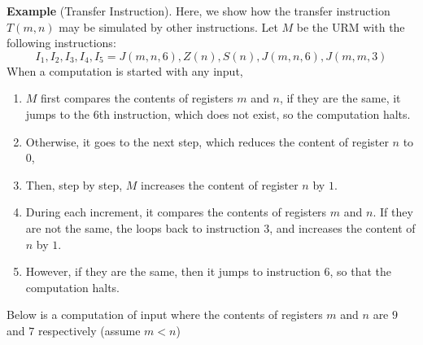 \documentclass[12pt]{article}
\begin{document}
\textbf{Example} (Transfer Instruction).  Here, we show how the transfer instruction $T(m,n)$ may be simulated by other instructions.  Let $M$ be the URM with the following instructions:
$$I_1,I_2,I_3,I_4,I_5=J(m,n,6),Z(n),S(n),J(m,n,6),J(m,m,3)$$
When a computation is started with any input, 
\begin{enumerate}
\item $M$ first compares the contents of registers $m$ and $n$, if they are the same, it jumps to the 6th instruction, which does not exist, so the computation halts.  
\item Otherwise, it goes to the next step, which reduces the content of register $n$ to $0$, 
\item Then, step by step, $M$ increases the content of register $n$ by $1$.  
\item During each increment, it compares the contents of registers $m$ and $n$.  If they are not the same, the loops back to instruction 3, and increases the content of $n$ by $1$.  
\item However, if they are the same, then it jumps to instruction 6, so that the computation halts.
\end{enumerate}

Below is a computation of input where the contents of registers $m$ and $n$ are $9$ and $7$ respectively (assume $m<n$)
\end{document}
